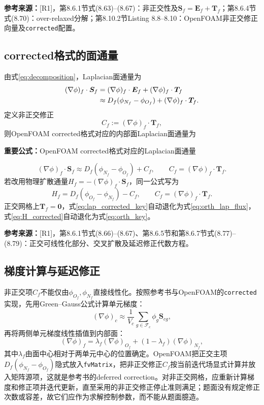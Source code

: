 \documentclass[UTF8,12pt,a4paper]{ctexart}
\numberwithin{equation}{section}
\newcommand{\Rone}{\textnormal{[R1]}}
\newcommand{\source}[1]{%
  \par\smallskip
  \noindent\colorbox{sourcebg}{%
    \parbox{0.955\linewidth}{\footnotesize\color{sourcegray}\textbf{参考来源：}#1}%
  }
  \par\smallskip
}
\newcommand{\keytitle}[1]{%
  \par\smallskip\noindent
  \colorbox{keybg}{\parbox{0.965\linewidth}{\color{keyblue}\textbf{重要公式：}#1}}
  \par\smallskip
}
\begin{document}
\source{\Rone，第8.6.1节式(8.63)--(8.67)：非正交性及$\bm S_f=\bm E_f+\bm T_f$；第8.6.4节式(8.70)：over-relaxed分解；第8.10.2节Listing 8.8--8.10：OpenFOAM非正交修正向量及\texttt{corrected}配置。}

\subsection{corrected格式的面通量}

由式\eqref{eq:decomposition}，Laplacian面通量为
\begin{align}
  (\nabla\phi)_f\cdot\bm S_f
  &=(\nabla\phi)_f\cdot\bm E_f
   +(\nabla\phi)_f\cdot\bm T_f
  \notag\\
  &\approx
  D_f(\phi_{N_f}-\phi_{O_f})
  +(\nabla\phi)_f\cdot\bm T_f.
  \label{eq:lap_flux_corrected}
\end{align}
定义非正交修正
\begin{equation}
  C_f:=(\nabla\phi)_f\cdot\bm T_f,
  \label{eq:C_definition}
\end{equation}
则OpenFOAM corrected格式对应的内部面Laplacian面通量为
\keytitle{OpenFOAM corrected格式对应的Laplacian面通量}
\begin{equation}
  \boxed{
  (\nabla\phi)_f\cdot\bm S_f
  \approx
  D_f(\phi_{N_f}-\phi_{O_f})+C_f,
  \qquad
  C_f=(\nabla\phi)_f\cdot\bm T_f.}
  \label{eq:lap_corrected_key}
\end{equation}
若改用物理扩散通量$H_f=-(\nabla\phi)_f\cdot\bm S_f$，同一公式写为
\begin{equation}
  \boxed{
  H_f
  =D_f(\phi_{O_f}-\phi_{N_f})-C_f,
  \qquad
  C_f=(\nabla\phi)_f\cdot\bm T_f.}
  \label{eq:H_corrected}
\end{equation}
正交网格上$\bm T_f=\bm0$，式\eqref{eq:lap_corrected_key}自动退化为式\eqref{eq:orth_lap_flux}，式\eqref{eq:H_corrected}自动退化为式\eqref{eq:orth_key}。

\source{\Rone，第8.6.1节式(8.66)--(8.67)、第8.6.5节和第8.6.7节式(8.77)--(8.79)：正交可线性化部分、交叉扩散及延迟修正代数方程。}

\subsection{梯度计算与延迟修正}

非正交项$C_f$不能仅由$\phi_{O_f},\phi_{N_f}$直接线性化。按照参考书与OpenFOAM的\texttt{corrected}实现，先用Green--Gauss公式计算单元梯度：
\begin{equation}
  (\nabla\phi)_c
  \approx
  \frac{1}{V_c}
  \sum_{g\in\mathcal F_c}
  \phi_g\bm S_{cg},
  \label{eq:gauss_grad}
\end{equation}
再将两侧单元梯度线性插值到内部面：
\begin{equation}
  (\nabla\phi)_f
  =\lambda_f(\nabla\phi)_{O_f}
  +(1-\lambda_f)(\nabla\phi)_{N_f},
  \label{eq:face_grad_interp}
\end{equation}
其中$\lambda_f$由面中心相对于两单元中心的位置确定。OpenFOAM把正交主项$D_f(\phi_{N_f}-\phi_{O_f})$隐式放入\texttt{fvMatrix}，把非正交修正$C_f$按当前迭代场显式计算并放入矩阵源项，这就是参考书的deferred correction。对非正交网格，应重新计算梯度和修正项并迭代更新，直至采用的非正交修正停止准则满足；题面没有规定修正次数或容差，故它们应作为求解控制参数，而不能从题面臆造。
\end{document}
